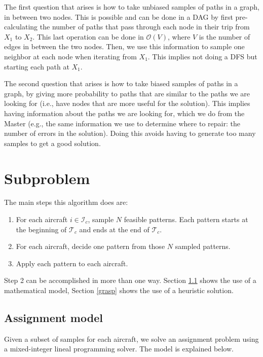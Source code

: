 \documentclass[a4paper,11pt]{article}
\begin{document}
    The first question that arises is how to take unbiased samples of paths in a graph, in between two nodes. This is possible and can be done in a DAG by first pre-calculating the number of paths that pass through each node in their trip from $X_1$ to $X_2$. This last operation can be done in $\mathcal{O}(V)$, where $V$ is the number of edges in between the two nodes. Then, we use this information to sample one neighbor at each node when iterating from $X_1$. This implies not doing a DFS but starting each path at $X_1$.

    The second question that arises is how to take biased samples of paths in a graph, by giving more probability to paths that are similar to the paths we are looking for (i.e., have nodes that are more useful for the solution). This implies having information about the paths we are looking for, which we do from the Master (e.g., the same information we use to determine where to repair: the number of errors in the solution). Doing this avoids having to generate too many samples to get a good solution.

\section{Subproblem}
  \label{sec:subproblems}
    
  The main steps this algorithm does are:

  \begin{enumerate}
    \item For each aircraft $i \in \mathcal{I}_{c}$, sample $N$ feasible patterns. Each pattern starts at the beginning of $\mathcal{T}_{c}$ and ends at the end of $\mathcal{T}_{c}$.
    \item For each aircraft, decide one pattern from those $N$ sampled patterns.
    \item Apply each pattern to each aircraft.
  \end{enumerate}

  Step 2 can be accomplished in more than one way. Section \ref{model} shows the use of a mathematical model, Section \ref{grasp} shows the use of a heuristic solution.

  \subsection{Assignment model}
    \label{model}

    Given a subset of samples for each aircraft, we solve an assignment problem using a mixed-integer lineal programming solver. The model is explained below.
\end{document}
